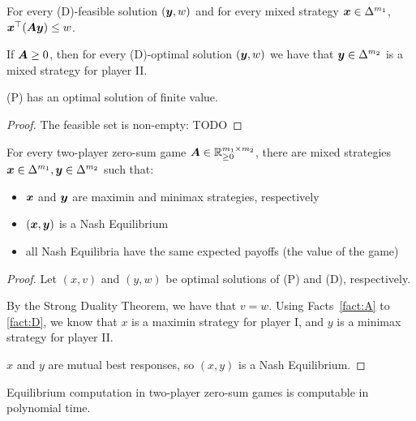 	\begin{fact}
		\label{fact:C}
		For every (D)-feasible solution $(\bm{y}, w)$ and for every
		mixed strategy $\bm{x} \in \Delta^{m_1}$,
		$\bm{x}^\top(\bm{A} \bm{y}) \le w$.
	\end{fact}

	\begin{fact}
		\label{fact:D}
		If $\bm{A} \ge 0$, then for every (D)-optimal solution
		$(\bm{y}, w)$ we have that $\bm{y} \in \Delta^{m_2}$ is a
		mixed strategy for player II.
	\end{fact}

	\begin{fact}
		(P) has an optimal solution of finite value.
	\end{fact}

	\begin{proof}
		The feasible set is non-empty: TODO
	\end{proof}

	\begin{theorem}
		For every two-player zero-sum game $\bm{A} \in \mathbb{R}^{m_1
		\times m_2}_{\ge 0}$, there are mixed strategies $\bm{x} \in
		\Delta^{m_1}, \bm{y} \in \Delta^{m_2}$ such that:
		\begin{itemize}
			\item $\bm{x}$ and $\bm{y}$ are maximin and minimax
				strategies, respectively
			\item $(\bm{x}, \bm{y})$ is a Nash Equilibrium
			\item all Nash Equilibria have the same expected payoffs (the
				\textnormal{value} of the game)
		\end{itemize}
	\end{theorem}

	\begin{proof}
		Let $(x, v)$ and $(y, w)$ be optimal solutions of (P) and (D),
		respectively.

		By the Strong Duality Theorem, we have that $v = w$. Using
		Facts~\ref{fact:A} to \ref{fact:D}, we know that $x$ is a maximin
		strategy for player I, and $y$ is a minimax strategy for player II.

		$x$ and $y$ are mutual best responses, so $(x,y)$ is a Nash
		Equilibrium.
	\end{proof}

	\begin{corollary}
		Equilibrium computation in two-player zero-sum games is computable
		in polynomial time.
	\end{corollary}
